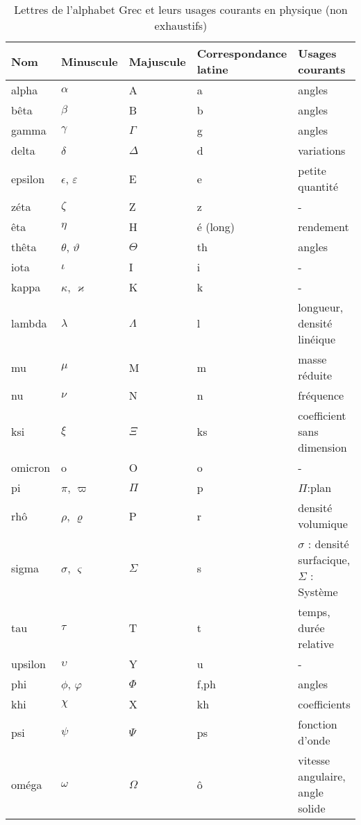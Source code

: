 \begin{table}[!h]
\centering
\begin{tabular}{@{}P{1.75cm}P{1.75cm}P{1.75cm}P{3.75cm}P{3.75cm}@{}}
\toprule
    Nom & Minuscule & Majuscule & Correspondance latine & Usages courants \\
\midrule
alpha & $\alpha$ & A & a & angles \\
bêta  & $\beta$  & B  & b & angles & \\
gamma & $\gamma$ & $\Gamma$ & g & angles \\
delta & $\delta$ & $\Delta$ & d & variations \\
epsilon & $\epsilon$, $\varepsilon$ & E & e & petite quantité \\
zéta & $\zeta$ & Z & z & -  \\
êta & $\eta$ & H & é (long) & rendement \\
thêta & $\theta$, $\vartheta$  & $\Theta$ & th & angles \\
iota & $\iota$ & I & i & - \\
kappa & $\kappa$, $\varkappa$ & K & k & - \\
lambda & $\lambda$ & $\Lambda$ & l & longueur, densité linéique \\
mu & $\mu$ & M & m & masse réduite \\
nu & $\nu$ & N & n & fréquence \\
ksi & $\xi$ & $\Xi$ & ks & coefficient sans dimension \\
omicron & o & O & o & - \\
pi & $\pi$, $\varpi$ & $\Pi$ & p & $\Pi$:plan \\
rhô & $\rho$, $\varrho$ & P & r & densité volumique \\
sigma & $\sigma$, 
        $\varsigma$ & $\Sigma$ & s & $\sigma$ : densité surfacique, 
                                     $\Sigma$ : Système  \\
tau & $\tau$ & T & t & temps, durée relative  \\
upsilon & $\upsilon$ & Y & u & -  \\
phi & $\phi$, $\varphi$ & $\Phi$ & f,ph & angles   \\
khi & $\chi$ & X  & kh & coefficients   \\
psi & $\psi$ & $\Psi$ & ps & fonction d'onde   \\
oméga & $\omega$ & $\Omega$ & ô & vitesse angulaire, angle solide   \\
\bottomrule
\end{tabular}
\caption{Lettres de l'alphabet Grec et leurs usages courants 
         en physique (non exhaustifs)}
\end{table}

